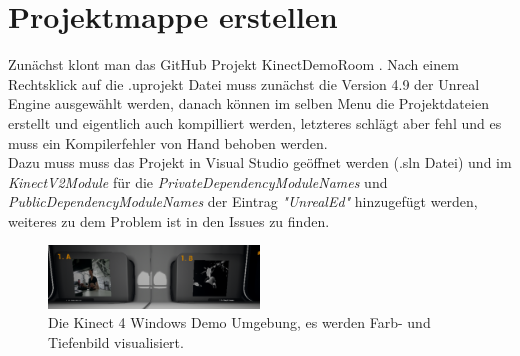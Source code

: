 \documentclass[a4paper]{IEEEtran}
\begin{document}
\section{Projektmappe erstellen}
	Zunächst klont man das GitHub Projekt KinectDemoRoom {\cite{k4w}}. 
	Nach einem Rechtsklick auf die .uprojekt Datei muss zunächst die Version 4.9 der Unreal Engine ausgewählt werden, danach können im selben Menu die Projektdateien erstellt und eigentlich auch kompilliert werden, letzteres schlägt aber fehl und es muss ein Kompilerfehler von Hand behoben werden. \\
	Dazu muss muss das Projekt in Visual Studio geöffnet werden (.sln Datei) und  im {\textit{KinectV2Module}} für die {\textit{PrivateDependencyModuleNames}} und {\textit{PublicDependencyModuleNames}} der Eintrag {\textit{"{}UnrealEd"{}}} hinzugefügt werden, weiteres zu dem Problem ist in den Issues {\cite{k4wissues}} zu finden.\\
	
	\begin{figure}[!h]
    	\centering
		\includegraphics[width=0.5\textwidth]{img/Kinect4Windows}
	    \caption{Die Kinect 4 Windows Demo Umgebung, es werden Farb- und Tiefenbild visualisiert.}
    	\label{Kinect4Windows}
	\end{figure}
\end{document}
